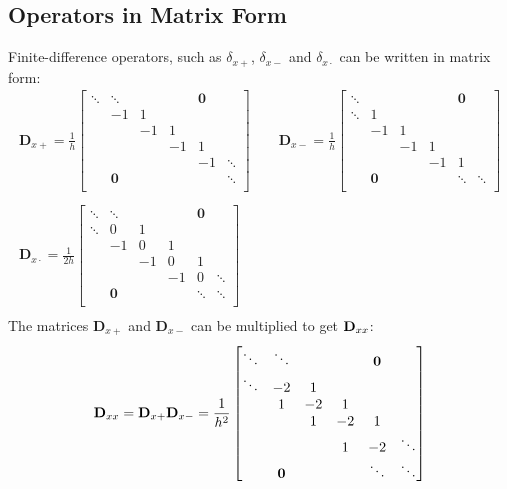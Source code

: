 \subsection{Operators in Matrix Form}
Finite-difference operators, such as $\delta_{x+}$,  $\delta_{x-}$ and $\delta_{x\cdot}$ can be written in matrix form:
\begin{gather*}
    \mathbf{D}_{x+} = \frac{1}{h}\begin{bmatrix}
        \ddots &\ddots & & & \mathbf{0}&\\
         & -1 & 1 & & & \\
        & & -1 & 1 & & \\
        & & & -1 & 1 & \\
        & & & & -1 & \ddots\\
        &\mathbf{0} & & & & \ddots \\
    \end{bmatrix}
    \qquad
    \mathbf{D}_{x-} = \frac{1}{h}\begin{bmatrix}
        \ddots & & & & \mathbf{0}&\\
        \ddots & 1 & & & & \\
        & -1 & 1 & & & \\
        & & -1 & 1 & & \\
        & & & -1 & 1 & \\
        &\mathbf{0} & & & \ddots & \ddots \\
    \end{bmatrix}\\
    \\
    \mathbf{D}_{x\cdot} = \frac{1}{2h}\begin{bmatrix}
        \ddots &\ddots & & & \mathbf{0}&\\
        \ddots & 0 & 1 & & & \\
        & -1 & 0 & 1 & & \\
        & & -1 & 0 & 1 & \\
        & & & -1 & 0 & \ddots \\
        &\mathbf{0} & & & \ddots & \ddots \\
    \end{bmatrix}\\
\end{gather*}
The matrices $\mathbf{D}_{x+}$ and $\mathbf{D}_{x-}$ can be multiplied to get $\mathbf{D}_{xx}$:
\begin{equation}
    \mathbf{D}_{xx} = \mathbf{D}_{x+}\mathbf{D}_{x-} = \frac{1}{h^2}\begin{bmatrix}
        \ddots &\ddots & & & \mathbf{0}&\\
        \ddots & -2 & 1 & & & \\
        & 1 & -2 & 1 & & \\
        & & 1 & -2 & 1 & \\
        & & & 1 & -2 & \ddots \\
        &\mathbf{0} & & & \ddots & \ddots \\
    \end{bmatrix}
\end{equation}
